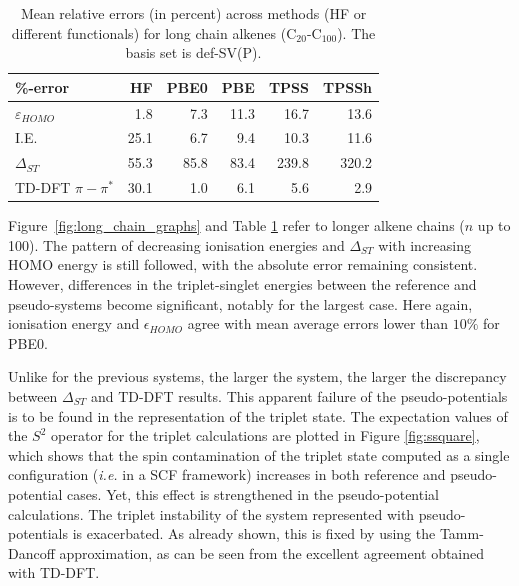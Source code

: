 \documentclass[aip]{revtex4-1}
\begin{document}
\begin{table}[ht]
\caption{Mean relative errors (in percent) across methods (HF or different functionals)
for long chain alkenes (C\(_{20}\)-C\(_{100}\)).
The basis set is def-SV(P).}
\begin{tabular}{l r r r r r }
\hline\hline
\%-error          & HF & PBE0 & PBE & TPSS & TPSSh \\
\hline
$\varepsilon_{HOMO}$    &  1.8 &  7.3   &  11.3   &  16.7    &  13.6 \\
I.E.                    & 25.1 &  6.7   &   9.4   &  10.3    &  11.6 \\
$\Delta_{ST}$           & 55.3 & 85.8   &  83.4   & 239.8    & 320.2 \\
TD-DFT $\pi-\pi^*$       & 30.1 &  1.0   &   6.1   &   5.6    &   2.9 \\ 
\hline\hline
\end{tabular}
\label{table:long_alkene_errors}
\end{table}

Figure~\ref{fig:long_chain_graphs} and Table \ref{table:long_alkene_errors} refer to longer 
alkene chains (\(n\) up to 100).
The pattern of decreasing ionisation energies and $\Delta_{ST}$ with increasing HOMO
energy is still followed, with the absolute error remaining consistent.
However, differences in the triplet-singlet energies between the reference and pseudo-systems 
become significant, notably for the largest case.
Here again, ionisation energy and $\epsilon_{HOMO}$ agree with mean average errors lower than
$10\%$ for PBE0.

Unlike for the previous systems, the larger the system, the larger the discrepancy between $\Delta_{ST}$
and TD-DFT results.
This apparent failure of the pseudo-potentials is to be found in the representation
of the triplet state.
The expectation values of the $S^2$ operator for the triplet calculations
are plotted in Figure \ref{fig:ssquare}, which shows that the spin contamination
of the triplet state computed as a single configuration (\emph{i.e.} in a SCF
framework) increases in both reference and pseudo-potential cases.
Yet, this effect is strengthened in the pseudo-potential calculations.
The triplet instability of the system represented with pseudo-potentials
is exacerbated.
As already shown, this is fixed by using the Tamm-Dancoff approximation,
as can be seen from the excellent agreement obtained with TD-DFT.\cite{tammdancoff}
\end{document}
